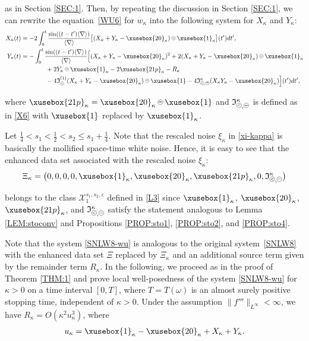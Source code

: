 \documentclass[%
11pt,  reqno]{amsart}
\def\<#1>{\xusebox{#1}}
\newcommand{\pe}{\mathbin{\scaleobj{0.7}{\tikz \draw (0,0) node[shape=circle,draw,inner sep=0pt,minimum size=8.5pt] {\scriptsize  $=$};}}}
\newcommand{\pl}{\mathbin{\scaleobj{0.7}{\tikz \draw (0,0) node[shape=circle,draw,inner sep=0pt,minimum size=8.5pt] {\scriptsize $<$};}}}
\newcommand{\pg}{\mathbin{\scaleobj{0.7}{\tikz \draw (0,0) node[shape=circle,draw,inner sep=0pt,minimum size=8.5pt] {\scriptsize $>$};}}}
\newcommand{\1}{\hspace{0.2mm}\text{I}\hspace{0.2mm}}
\newcommand{\noi}{\noindent}
\newcommand{\nb}{\nabla}
\newcommand{\eps}{\varepsilon}
\newcommand{\kk}{\kappa}
\renewcommand{\o}{\omega}
\newcommand{\jb}[1]
{\langle #1 \rangle}
\newcommand{\If}{\mathfrak{I}}
\numberwithin{equation}{section}
\numberwithin{theorem}{section}
\begin{document}
\noi
as in Section \ref{SEC:1}.
Then, by repeating the discussion in Section \ref{SEC:1}, 
we can rewrite the equation~\eqref{WU6} for $w_\kk$
into the following system for $X_\kk$ and $Y_\kk$:
\begin{align}
\begin{split}
 X_\kk (t)  &  =  -2 \int_0^t \frac{\sin((t-t')\jb{\nb})}{\jb{\nb}} 
 \big[(X_\kk+ Y_\kk - \<20>_\kk)\pl \<1>_\kk\big](t')dt',  \\
Y_\kk  (t) &   = 
- 
 \int_0^t \frac{\sin((t-t')\jb{\nb})}{\jb{\nb}} 
\Big[(X_\kk+Y_\kk-\<20>_\kk)^2 +  2(X_\kk + Y_\kk - \<20>_\kk)\pg \<1>_\kk\\
& \hspace{4em} 
+ 2 Y_\kk \pe \<1>_\kk - 2 \<21p>_\kk
  -R_\kk \\%
& \hspace{4em}
 -4 \If_{\pl}^{(1)}(X_\kk+  Y_\kk - \<20>_\kk)\pe \<1> 
 -4\If_{\pl, \pe}^\kk(X_\kk Y_\kk - \<20>_\kk)\Big] (t') dt', 
\end{split}
 \label{SNLW8-wu}
\end{align}


\noi
where $\<21p>_\kk = \<20>_\kk\pe \<1>$
and $ \If_{\pl, \pe}^\kk$
is defined as in \eqref{X6} with $\<1>$ replaced by $\<1>_\kk$.


Let $\frac 14 < s_1 < \frac 12 < s_2 \leq s_1 + \frac 14$.
Note that the rescaled noise $\xi_\kk$ in \eqref{xi-kappa}  is basically the mollified
space-time white noise.
Hence, it is easy to see that 
the enhanced data set associated with the rescaled noise $\xi_\kk$:
\begin{align}
\Xi_\kk
= \big(0, 0, 0, 0, \<1>_\kk, \<20>_\kk,  \<21p>_\kk, 
0, 
 \If_{\pl, \pe}^\kk\big)
\label{so6-wu}
\end{align}

\noi
belongs to the class $\mathcal{X}^{s_1, s_2, \eps}_1$ defined in \eqref{L3}
since 
 $\<1>_\kk$, $\<20>_\kk$,  $\<21p>_\kk$,
 and  
$ \If_{\pl, \pe}^\kk$
satisfy the statement analogous
to Lemma \ref{LEM:stoconv}
and  Propositions \ref{PROP:sto1}, \ref{PROP:sto2},  and \ref{PROP:sto4}. 




Note that the system \eqref{SNLW8-wu}
 is analogous to the original system~\eqref{SNLW8}
with the enhanced data set $\Xi$ replaced by $\Xi_\kk$ and  an additional source term given by the remainder
term  $R_\kk$. 
In the following, we  proceed as in the proof of Theorem \ref{THM:1}
and prove 
local well-posedness of the system \eqref{SNLW8-wu}
for  $\kk > 0$ on a time interval $[0, T]$,
where  $T = T(\o)$
is an almost surely positive stopping time, 
independent of $\kk > 0$.
Under the assumption $\|f'''\|_{L^\infty} < \infty$, 
we have  $R_\kk = O(\kk^2 u_\kk^3)$, 
where 
\begin{align*}
 u_\kk =  \<1>_\kk - \<20>_\kk + X_\kk + Y_\kk.
 \end{align*}
\end{document}
